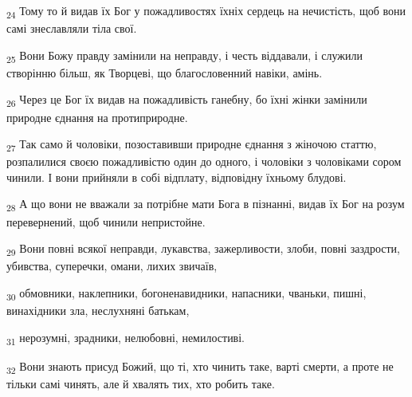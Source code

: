 \begin{tcolorbox}
\textsubscript{24} Тому то й видав їх Бог у пожадливостях їхніх сердець на нечистість, щоб вони самі знеславляли тіла свої.
\end{tcolorbox}
\begin{tcolorbox}
\textsubscript{25} Вони Божу правду замінили на неправду, і честь віддавали, і служили створінню більш, як Творцеві, що благословенний навіки, амінь.
\end{tcolorbox}
\begin{tcolorbox}
\textsubscript{26} Через це Бог їх видав на пожадливість ганебну, бо їхні жінки замінили природне єднання на протиприродне.
\end{tcolorbox}
\begin{tcolorbox}
\textsubscript{27} Так само й чоловіки, позоставивши природне єднання з жіночою статтю, розпалилися своєю пожадливістю один до одного, і чоловіки з чоловіками сором чинили. І вони прийняли в собі відплату, відповідну їхньому блудові.
\end{tcolorbox}
\begin{tcolorbox}
\textsubscript{28} А що вони не вважали за потрібне мати Бога в пізнанні, видав їх Бог на розум перевернений, щоб чинили непристойне.
\end{tcolorbox}
\begin{tcolorbox}
\textsubscript{29} Вони повні всякої неправди, лукавства, зажерливости, злоби, повні заздрости, убивства, суперечки, омани, лихих звичаїв,
\end{tcolorbox}
\begin{tcolorbox}
\textsubscript{30} обмовники, наклепники, богоненавидники, напасники, чваньки, пишні, винахідники зла, неслухняні батькам,
\end{tcolorbox}
\begin{tcolorbox}
\textsubscript{31} нерозумні, зрадники, нелюбовні, немилостиві.
\end{tcolorbox}
\begin{tcolorbox}
\textsubscript{32} Вони знають присуд Божий, що ті, хто чинить таке, варті смерти, а проте не тільки самі чинять, але й хвалять тих, хто робить таке.
\end{tcolorbox}
